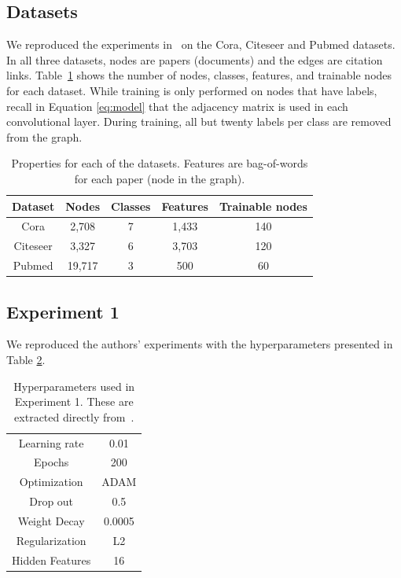 \subsection{Datasets}

We reproduced the experiments in~\cite{Kipf2016} on the Cora, Citeseer and Pubmed datasets. In all three datasets, nodes are papers (documents) and the edges are citation links. Table~\ref{tab:datasets} shows the number of nodes, classes, features, and trainable nodes for each dataset. While training is only performed on nodes that have labels, recall in Equation \ref{eq:model} that the adjacency matrix is used in each convolutional layer. During training, all but twenty labels per class are removed from the graph. 

\begin {table}[ht!]
  \begin{center}
    \begin{tabular}{|c|c|c|c|c|}
    \hline
    Dataset  & Nodes  & Classes & Features & Trainable nodes\\
    \hline 
    Cora     & 2,708  & 7       & 1,433    & 140 \\ 
    Citeseer & 3,327  & 6       & 3,703    & 120  \\  
    Pubmed   & 19,717 & 3       & 500      & 60   \\
    \hline
    \end{tabular}
  \end{center}
\caption {Properties for each of the datasets. Features are bag-of-words for each paper (node in the graph).} \label{tab:datasets} 
\end{table}

\subsection{Experiment 1}

We reproduced the authors' experiments with the hyperparameters presented in Table \ref{tab:hyperparameters1}.

\begin {table}[ht!]
  \begin{center}
    \begin{tabular}{|c|c|}
    \hline
    Learning rate     & 0.01 \\ 
    Epochs            & 200  \\ 
    Optimization      & ADAM \\
    Drop out          & 0.5   \\
    Weight Decay      & 0.0005 \\
    Regularization    & L2    \\
    Hidden Features   & 16    \\
    \hline
    \end{tabular}
  \end{center}
\caption {Hyperparameters used in Experiment 1. These are extracted directly from~\cite{Kipf2016}.} \label{tab:hyperparameters1} 
\end{table}

